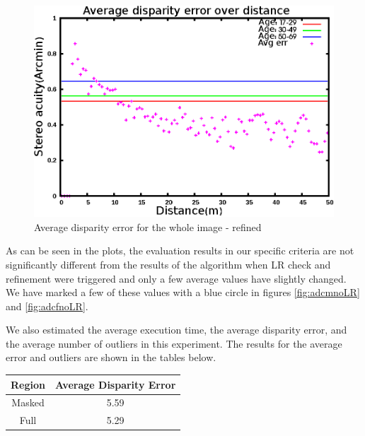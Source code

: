 \begin{figure}[H]
\centering
\includegraphics[scale=0.8]{adcenfull3}
\caption{Average disparity error for the whole image - refined}
\label{fig:adcf3}
\end{figure} 

As can be seen in the plots, the evaluation results in our specific criteria 
are not significantly different from the results of the algorithm when LR check and refinement were triggered
and only a few average values have slightly changed. We have marked a few of these values with a blue circle in figures \ref{fig:adcmnoLR} and \ref{fig:adcfnoLR}.

We also estimated the average execution time, the average disparity error, and the average number of outliers in this experiment. The results for 
the average error and outliers are shown in the tables below. \newline

\begin{minipage}{0.8\linewidth}
\begin{center}
\label{tab:adcerrNref}
\begin{tabular}{|c|c|}
\hline
Region & Average Disparity Error \\ \hline
Masked & 5.59 \\  \hline
Full & 5.29 \\ \hline
\end{tabular}
\end{center}
\end{minipage} \newline

